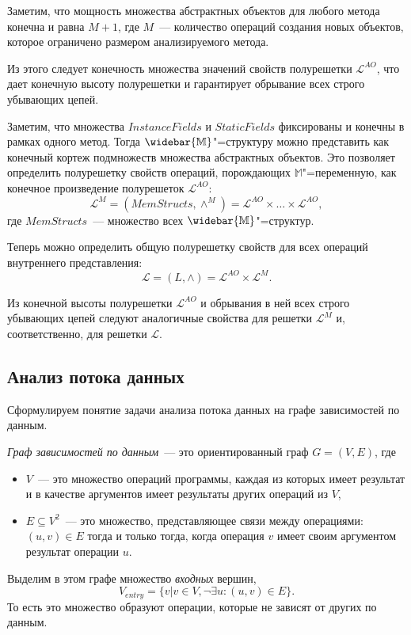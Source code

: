 \documentclass[14pt,titlepage,draft]{extarticle}
\newcommand{\M}{\ensuremath{\mathbb{M}}}
\newcommand{\Ms}{\ensuremath{\mathbb{\widebar{M}}}}
\newcommand{\Lattice}{\mathcal{L}}
\newcommand{\meet}{\wedge}
\begin{document}
    Заметим, что мощность множества абстрактных объектов для любого
    метода конечна и равна $M + 1$,
    где $M$~--- количество операций создания новых объектов, которое ограничено
    размером анализируемого метода.

    Из этого следует конечность множества значений свойств полурешетки
    $\Lattice^{AO}$, что дает конечную высоту полурешетки и гарантирует
    обрывание всех строго убывающих цепей.

    Заметим, что множества $InstanceFields$ и $StaticFields$ фиксированы и
    конечны в рамках одного метод.
    Тогда \Ms"=структуру можно представить как конечный кортеж подмножеств
    множества абстрактных объектов.
    Это позволяет определить полурешетку свойств операций, порождающих
    \M"=переменную, как конечное произведение полурешеток $\Lattice^{AO}$:
    \[\Lattice^M = (MemStructs, \meet^M) =
      \Lattice^{AO} \times \ldots \times \Lattice^{AO},\]
    где $MemStructs$~--- множество всех \Ms"=структур.

    Теперь можно определить общую полурешетку свойств для всех операций
    внутреннего представления:
    \[ \Lattice = (L, \meet) = \Lattice^{AO} \times \Lattice^M. \]

    Из конечной высоты полурешетки $\Lattice^{AO}$
    и обрывания в ней всех строго убывающих цепей следуют аналогичные свойства
    для решетки $\Lattice^M$ и, соответственно, для решетки $\Lattice$.

  \subsection{Анализ потока данных}

    Сформулируем понятие задачи анализа потока данных на графе зависимостей по
    данным.

    \emph{Граф зависимостей по данным}~--- это ориентированный граф
    $G = (V, E)$, где
    \begin{itemize}
      \item $V$~--- это множество операций программы, каждая из которых имеет
            результат и в качестве аргументов имеет результаты других операций
            из $V$,
      \item $E \subseteq V^2$~--- это множество, представляющее связи между
            операциями: $(u, v) \in E$ тогда и только тогда, когда операция $v$
            имеет своим аргументом результат операции $u$.
    \end{itemize}

    Выделим в этом графе множество \emph{входных} вершин,
    \[ V_{entry} = \{ v | v \in V, \lnot \exists u\colon (u, v) \in E \}. \]
    То есть это множество образуют операции, которые не зависят от других по
    данным.
\end{document}
